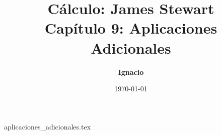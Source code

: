 \documentclass[11pt,spanish,oneside]{report}
\title{\textbf{Cálculo: James Stewart} \\ \Large Capítulo 9: Aplicaciones Adicionales}
\author{\textbf{Ignacio}}
\date{\today}
\begin{document}
\maketitle

{aplicaciones_adicionales.tex}
\end{document}
